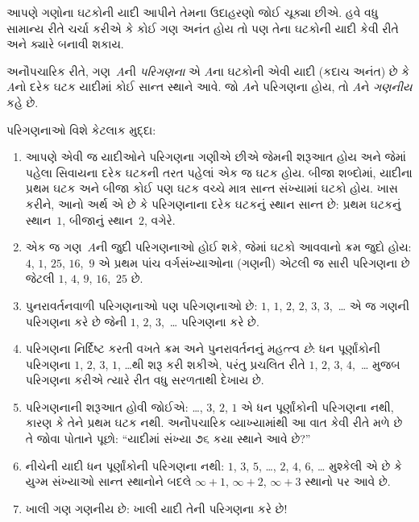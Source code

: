 \begin{explain}
આપણે ગણોના ઘટકોની યાદી આપીને તેમના ઉદાહરણો
જોઈ ચૂક્યા છીએ. હવે વધુ સામાન્ય રીતે ચર્ચા કરીએ કે
કોઈ ગણ અનંત હોય તો પણ તેના ઘટકોની યાદી
કેવી રીતે અને ક્યારે બનાવી શકાય.
\end{explain}

\begin{defn}[પરિગણના, અનૌપચારિક રીતે]
અનૌપચારિક રીતે, ગણ~$A$ની \emph{પરિગણના} એ
$A$ના ઘટકોની એવી યાદી (કદાચ અનંત) છે
કે $A$નો દરેક ઘટક યાદીમાં કોઈ સાન્ત સ્થાને
આવે. જો $A$ને પરિગણના હોય, તો $A$ને
\emph{ગણનીય} કહે છે.
\end{defn}

\begin{explain}
પરિગણનાઓ વિશે કેટલાક મુદ્દા:
\begin{enumerate}
\item આપણે એવી જ યાદીઓને પરિગણના ગણીએ છીએ જેમની
  શરૂઆત હોય અને જેમાં પહેલા સિવાયના દરેક ઘટકની
  તરત પહેલાં એક જ ઘટક હોય. બીજા શબ્દોમાં,
  યાદીના પ્રથમ ઘટક અને બીજા કોઈ પણ ઘટક
  વચ્ચે માત્ર સાન્ત સંખ્યામાં ઘટકો હોય. ખાસ કરીને,
  આનો અર્થ એ છે કે પરિગણનાના દરેક ઘટકનું
  સ્થાન સાન્ત છે: પ્રથમ ઘટકનું સ્થાન~$1$,
  બીજાનું સ્થાન~$2$, વગેરે.
\item એક જ ગણ~$A$ની જુદી પરિગણનાઓ હોઈ શકે,
  જેમાં ઘટકો આવવાનો ક્રમ જુદો હોય:
  $4$, $1$, $25$, $16$,~$9$ એ પ્રથમ પાંચ
  વર્ગસંખ્યાઓના (ગણની) એટલી જ સારી પરિગણના છે
  જેટલી $1$, $4$, $9$, $16$,~$25$ છે.
\item પુનરાવર્તનવાળી પરિગણનાઓ પણ પરિગણનાઓ છે:
  $1$, $1$, $2$, $2$, $3$, $3$,~\dots{}
  એ જ ગણની પરિગણના કરે છે જેની $1$, $2$,
  $3$,~\dots{} પરિગણના કરે છે.
\item પરિગણના નિર્દિષ્ટ કરતી વખતે ક્રમ અને પુનરાવર્તનનું
  મહત્ત્વ \emph{છે}: ધન પૂર્ણાંકોની પરિગણના
  $1$, $2$, $3$, $1$, \dots{}થી શરૂ કરી શકીએ,
  પરંતુ પ્રચલિત રીતે $1$, $2$, $3$, $4$,~\dots
  મુજબ પરિગણના કરીએ ત્યારે રીત વધુ સરળતાથી દેખાય છે.
\item પરિગણનાની શરૂઆત હોવી જોઈએ: \dots, $3$, $2$, $1$
  એ ધન પૂર્ણાંકોની પરિગણના નથી, કારણ કે તેને પ્રથમ
  ઘટક નથી. અનૌપચારિક વ્યાખ્યામાંથી આ વાત
  કેવી રીતે મળે છે તે જોવા પોતાને પૂછો: “યાદીમાં
  સંખ્યા ૭૬ કયા સ્થાને આવે છે?”
\item નીચેની યાદી ધન પૂર્ણાંકોની પરિગણના નથી:
  $1$, $3$, $5$, \dots, $2$, $4$, $6$, \dots\@
  મુશ્કેલી એ છે કે યુગ્મ સંખ્યાઓ સાન્ત સ્થાનોને બદલે
  $\infty + 1$, $\infty + 2$, $\infty +
  3$ સ્થાનો પર આવે છે.
\item ખાલી ગણ ગણનીય છે: ખાલી યાદી તેની પરિગણના કરે છે!{}
\end{enumerate}
\end{explain}

